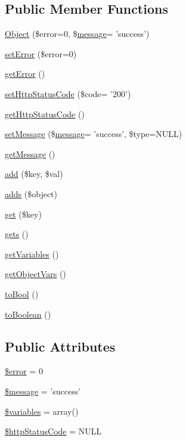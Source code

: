 \subsection*{Public Member Functions}
\begin{DoxyCompactItemize}
\item 
\hyperlink{classObject_a9c1f4bf33208a5c858c0722afce90f30}{Object} (\$error=0, \$\hyperlink{classmessage}{message}= 'success')
\item 
\hyperlink{classObject_a12f7ac70214558a1774ca010865c798e}{set\-Error} (\$error=0)
\item 
\hyperlink{classObject_a2aaced460a018edd69bf17813d6c48df}{get\-Error} ()
\item 
\hyperlink{classObject_a56a37e14694356404f793dd0ab02e2af}{set\-Http\-Status\-Code} (\$code= '200')
\item 
\hyperlink{classObject_a5cb4abc24dd01e04c24da487d476efc0}{get\-Http\-Status\-Code} ()
\item 
\hyperlink{classObject_a28eb2a0ea4a14ff617d78505c38c906c}{set\-Message} (\$\hyperlink{classmessage}{message}= 'success', \$type=N\-U\-L\-L)
\item 
\hyperlink{classObject_a813487b153bfe18102ac76d8c718999f}{get\-Message} ()
\item 
\hyperlink{classObject_a4f8a7fa8794663b7625fc15c9589797b}{add} (\$key, \$val)
\item 
\hyperlink{classObject_a6dbae38facc1000561b8b230847aaca1}{adds} (\$object)
\item 
\hyperlink{classObject_ae6dff49b7ab68822bdb4ce6940c10d3f}{get} (\$key)
\item 
\hyperlink{classObject_ad6f51071a4048c1fed581748065e4d68}{gets} ()
\item 
\hyperlink{classObject_ad33c509ec041fb43c6e25f8155577925}{get\-Variables} ()
\item 
\hyperlink{classObject_afe1fe6fc005389cd616a5e9105de977a}{get\-Object\-Vars} ()
\item 
\hyperlink{classObject_a409216fd5ab386b1e78e311440113f75}{to\-Bool} ()
\item 
\hyperlink{classObject_afafb45098e163c179940c7e1ddc67fe2}{to\-Boolean} ()
\end{DoxyCompactItemize}
\subsection*{Public Attributes}
\begin{DoxyCompactItemize}
\item 
\hyperlink{classObject_a891a586df36cca119a56bb509f582858}{\$error} = 0
\item 
\hyperlink{classObject_af661550c62873d6b6e61f32d68c56973}{\$message} = 'success'
\item 
\hyperlink{classObject_a153e76f6619408780cc2b50cef5100c6}{\$variables} = array()
\item 
\hyperlink{classObject_a82ad6bb41d770d91d9d10a97495669d0}{\$http\-Status\-Code} = N\-U\-L\-L
\end{DoxyCompactItemize}


